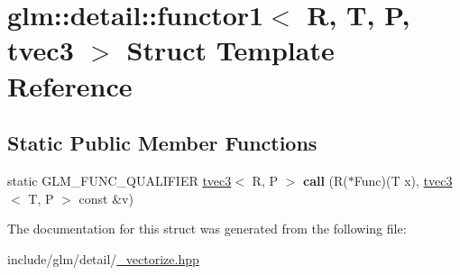 \hypertarget{structglm_1_1detail_1_1functor1_3_01R_00_01T_00_01P_00_01tvec3_01_4}{}\section{glm\+:\+:detail\+:\+:functor1$<$ R, T, P, tvec3 $>$ Struct Template Reference}
\label{structglm_1_1detail_1_1functor1_3_01R_00_01T_00_01P_00_01tvec3_01_4}
\subsection*{Static Public Member Functions}
\begin{DoxyCompactItemize}
\item 
\mbox{\label{structglm_1_1detail_1_1functor1_3_01R_00_01T_00_01P_00_01tvec3_01_4_a8ae374d9111e3de3d32f18762f1918cc}} 
static G\+L\+M\+\_\+\+F\+U\+N\+C\+\_\+\+Q\+U\+A\+L\+I\+F\+I\+ER \hyperlink{structglm_1_1tvec3}{tvec3}$<$ R, P $>$ {\bfseries call} (R($\ast$Func)(T x), \hyperlink{structglm_1_1tvec3}{tvec3}$<$ T, P $>$ const \&v)
\end{DoxyCompactItemize}


The documentation for this struct was generated from the following file\+:\begin{DoxyCompactItemize}
\item 
include/glm/detail/\hyperlink{__vectorize_8hpp}{\+\_\+vectorize.\+hpp}\end{DoxyCompactItemize}
